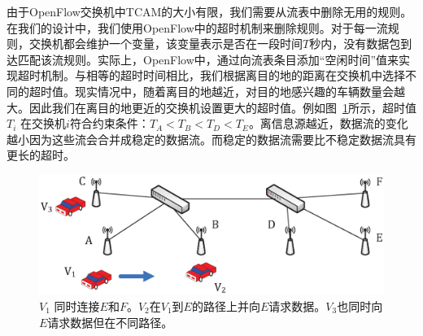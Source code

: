 由于OpenFlow交换机中TCAM的大小有限，我们需要从流表中删除无用的规则。在我们的设计中，我们使用OpenFlow中的超时机制来删除规则。对于每一流规则，交换机都会维护一个变量，该变量表示是否在一段时间$T$秒内，没有数据包到达匹配该流规则。实际上，OpenFlow中，通过向流表条目添加``空闲时间''值来实现超时机制。与相等的超时时间相比，我们根据离目的地的距离在交换机中选择不同的超时值。现实情况中，随着离目的地越近，对目的地感兴趣的车辆数量会越大。因此我们在离目的地更近的交换机设置更大的超时值。例如图~\ref{fig4}所示，超时值$T_{i}$ 在交换机$i$符合约束条件：$ T_{A} < T_{B} < T_{D} < T_{E}$。离信息源越近，数据流的变化越小因为这些流会合并成稳定的数据流。而稳定的数据流需要比不稳定数据流具有更长的超时。



\begin{figure} [t]
\begin{center}
\includegraphics[width=1\columnwidth]{figures/fig-4-31.eps}

\caption{$V_{1}$ 同时连接$E$和$F$。$V_{2}$在$V_{1}$到$E$的路径上并向$E$请求数据。$V_{3}$也同时向$E$请求数据但在不同路径。} \label{fig4}
\end{center}
\end{figure}

